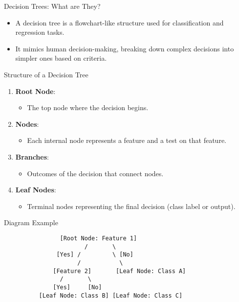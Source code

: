 \documentclass[aspectratio=169]{beamer}
\begin{document}
\begin{frame}[fragile]{Decision Trees: What are They?}
  \begin{itemize}
    \item A decision tree is a flowchart-like structure used for classification and regression tasks.
    \item It mimics human decision-making, breaking down complex decisions into simpler ones based on criteria.
  \end{itemize}
\end{frame}

\begin{frame}[fragile]{Structure of a Decision Tree}
  \begin{enumerate}
    \item \textbf{Root Node}:
      \begin{itemize}
        \item The top node where the decision begins.
      \end{itemize}
    \item \textbf{Nodes}:
      \begin{itemize}
        \item Each internal node represents a feature and a test on that feature.
      \end{itemize}
    \item \textbf{Branches}:
      \begin{itemize}
        \item Outcomes of the decision that connect nodes.
      \end{itemize}
    \item \textbf{Leaf Nodes}:
      \begin{itemize}
        \item Terminal nodes representing the final decision (class label or output).
      \end{itemize}
  \end{enumerate}
  \begin{block}{Diagram Example}
  \begin{verbatim}
                [Root Node: Feature 1]
                       /       \
               [Yes] /         \ [No]
                     /           \
              [Feature 2]       [Leaf Node: Class A]
                /       \
              [Yes]     [No]
          [Leaf Node: Class B] [Leaf Node: Class C]
  \end{verbatim}
  \end{block}
\end{frame}
\end{document}
